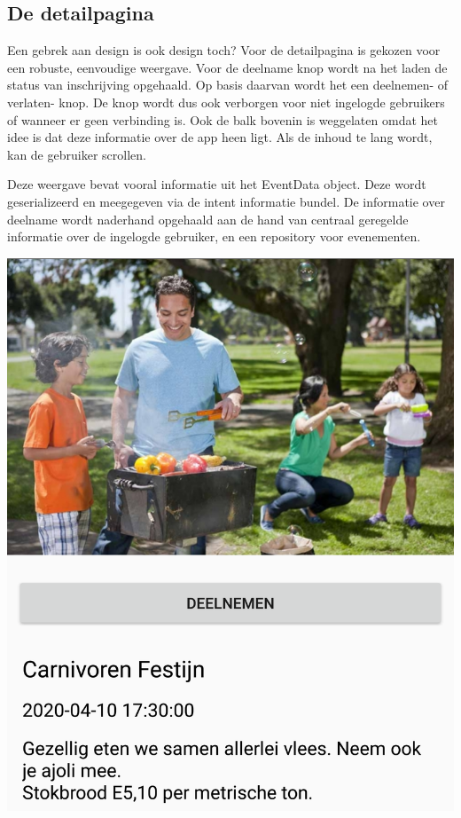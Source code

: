 \documentclass[dutch]{report}
\begin{document}
	\subsection{De detailpagina}
	\begin{minipage}{0.60\textwidth}
	Een gebrek aan design is ook design toch? Voor de detailpagina is gekozen voor een robuste, eenvoudige
	weergave. Voor de deelname knop wordt na het laden de status van inschrijving opgehaald. Op basis daarvan
	wordt het een deelnemen- of verlaten- knop. De knop wordt dus ook verborgen voor niet ingelogde gebruikers
	of wanneer er geen verbinding is. Ook de balk bovenin is weggelaten omdat het idee is dat deze informatie
	over de app heen ligt. Als de inhoud te lang wordt, kan de gebruiker scrollen. 
	
	Deze weergave bevat vooral informatie uit het EventData object. Deze wordt geserializeerd en meegegeven 
	via de intent informatie bundel. De informatie over deelname wordt naderhand opgehaald aan de hand van 
	centraal geregelde informatie over de ingelogde gebruiker, en een repository voor evenementen. 
	
	\end{minipage}
	\hfill
	\begin{minipage}{0.35\textwidth}
		\includegraphics[width=\linewidth]{images/detailview.png}
	\end{minipage}
	
\end{document}
